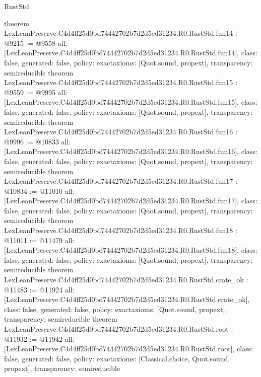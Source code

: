 \begin{lexlean}{RustStd}
\begin{coremodule}
{}
theorem LexLeanPreserve.C4d4ff25d0bd74442702b7d2d5ed31234.R0.RustStd.fun14 : @9215 := @9558 {
  all: [LexLeanPreserve.C4d4ff25d0bd74442702b7d2d5ed31234.R0.RustStd.fun14],
  class: false,
  generated: false,
  policy: exact{axioms: [Quot.sound, propext]},
  transparency: semireducible
}
theorem LexLeanPreserve.C4d4ff25d0bd74442702b7d2d5ed31234.R0.RustStd.fun15 : @9559 := @9995 {
  all: [LexLeanPreserve.C4d4ff25d0bd74442702b7d2d5ed31234.R0.RustStd.fun15],
  class: false,
  generated: false,
  policy: exact{axioms: [Quot.sound, propext]},
  transparency: semireducible
}
theorem LexLeanPreserve.C4d4ff25d0bd74442702b7d2d5ed31234.R0.RustStd.fun16 : @9996 := @10833 {
  all: [LexLeanPreserve.C4d4ff25d0bd74442702b7d2d5ed31234.R0.RustStd.fun16],
  class: false,
  generated: false,
  policy: exact{axioms: [Quot.sound, propext]},
  transparency: semireducible
}
theorem LexLeanPreserve.C4d4ff25d0bd74442702b7d2d5ed31234.R0.RustStd.fun17 : @10834 := @11010 {
  all: [LexLeanPreserve.C4d4ff25d0bd74442702b7d2d5ed31234.R0.RustStd.fun17],
  class: false,
  generated: false,
  policy: exact{axioms: [Quot.sound, propext]},
  transparency: semireducible
}
theorem LexLeanPreserve.C4d4ff25d0bd74442702b7d2d5ed31234.R0.RustStd.fun18 : @11011 := @11479 {
  all: [LexLeanPreserve.C4d4ff25d0bd74442702b7d2d5ed31234.R0.RustStd.fun18],
  class: false,
  generated: false,
  policy: exact{axioms: [Quot.sound, propext]},
  transparency: semireducible
}
theorem LexLeanPreserve.C4d4ff25d0bd74442702b7d2d5ed31234.R0.RustStd.crate_ok : @11483 := @11924 {
  all: [LexLeanPreserve.C4d4ff25d0bd74442702b7d2d5ed31234.R0.RustStd.crate_ok],
  class: false,
  generated: false,
  policy: exact{axioms: [Quot.sound, propext]},
  transparency: semireducible
}
theorem LexLeanPreserve.C4d4ff25d0bd74442702b7d2d5ed31234.R0.RustStd.root : @11932 := @11942 {
  all: [LexLeanPreserve.C4d4ff25d0bd74442702b7d2d5ed31234.R0.RustStd.root],
  class: false,
  generated: false,
  policy: exact{axioms: [Classical.choice, Quot.sound, propext]},
  transparency: semireducible
}


\end{coremodule}
\end{lexlean}
